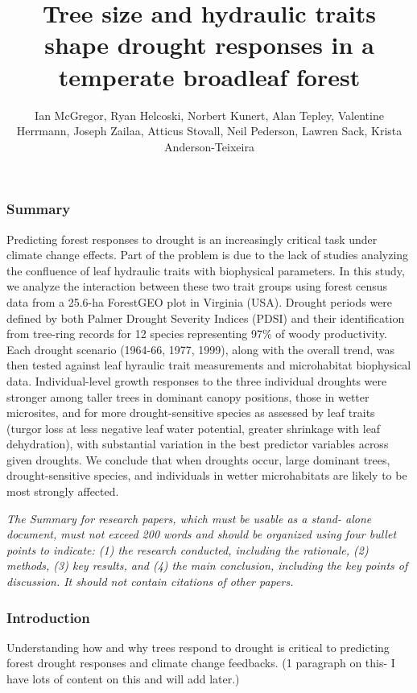 \documentclass[]{article}
\title{Tree size and hydraulic traits shape drought responses in a temperate
broadleaf forest}
\author{Ian McGregor, Ryan Helcoski, Norbert Kunert, Alan Tepley, Valentine
Herrmann, Joseph Zailaa, Atticus Stovall, Neil Pederson, Lawren Sack,
Krista Anderson-Teixeira}
\date{}
\begin{document}
\maketitle

\subsubsection{Summary}\label{summary}

Predicting forest responses to drought is an increasingly critical task
under climate change effects. Part of the problem is due to the lack of
studies analyzing the confluence of leaf hydraulic traits with
biophysical parameters. In this study, we analyze the interaction
between these two trait groups using forest census data from a 25.6-ha
ForestGEO plot in Virginia (USA). Drought periods were defined by both
Palmer Drought Severity Indices (PDSI) and their identification from
tree-ring records for 12 species representing 97\% of woody
productivity. Each drought scenario (1964-66, 1977, 1999), along with
the overall trend, was then tested against leaf hyraulic trait
measurements and microhabitat biophysical data. Individual-level growth
responses to the three individual droughts were stronger among taller
trees in dominant canopy positions, those in wetter microsites, and for
more drought-sensitive species as assessed by leaf traits (turgor loss
at less negative leaf water potential, greater shrinkage with leaf
dehydration), with substantial variation in the best predictor variables
across given droughts. We conclude that when droughts occur, large
dominant trees, drought-sensitive species, and individuals in wetter
microhabitats are likely to be most strongly affected.

\emph{The Summary for research papers, which must be usable as a stand-
alone document, must not exceed 200 words and should be organized using
four bullet points to indicate: (1) the research conducted, including
the rationale, (2) methods, (3) key results, and (4) the main
conclusion, including the key points of discussion. It should not
contain citations of other papers.}

\subsubsection{Introduction}\label{introduction}

Understanding how and why trees respond to drought is critical to
predicting forest drought responses and climate change feedbacks. (1
paragraph on this- I have lots of content on this and will add later.)
\end{document}
